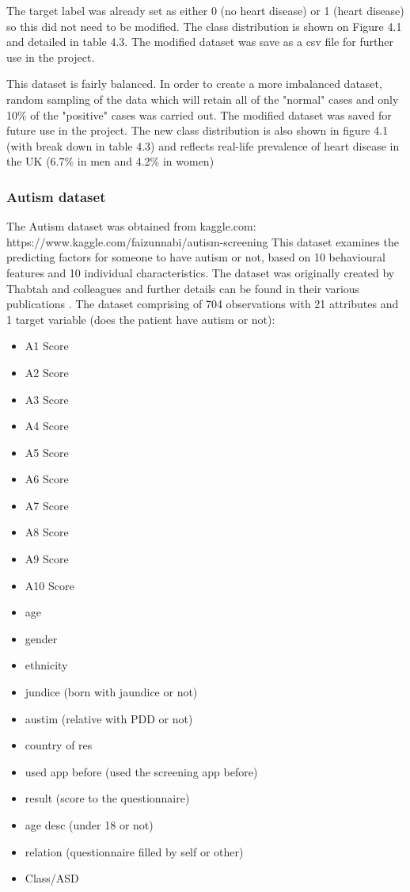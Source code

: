 The target label was already set as either 0 (no heart disease) or 1 (heart disease) so this did not need to be modified. 
The class distribution is shown on Figure 4.1 and detailed in table 4.3. The modified dataset was save as a csv file for further use in the project.

This dataset is fairly balanced. In order to create a more imbalanced dataset, random sampling of the data which will retain all of the "normal" cases and only 10\% of the "positive" cases was carried out. The modified dataset was saved for future use in the project. The new class distribution is also shown in figure 4.1 (with break down in table 4.3) and reflects real-life prevalence of heart disease in the UK (6.7\% in men and 4.2\% in women) \citep{}\newline

\subsubsection{Autism dataset}
The Autism dataset was obtained from kaggle.com:\newline
https://www.kaggle.com/faizunnabi/autism-screening\newline
This dataset examines the predicting factors for someone to have autism or not, based on 10 behavioural features and 10 individual characteristics. The dataset was originally created by Thabtah and colleagues \citep{} and further details can be found in their various publications \cite{}.\newline
The dataset comprising of 704 observations with 21 attributes and 1 target variable (does the patient have autism or not):\newline
\begin{itemize}
    \item A1 Score 
    \item A2 Score
    \item A3 Score 
    \item A4 Score
    \item A5 Score
    \item A6 Score
    \item A7 Score
    \item A8 Score
    \item A9 Score
    \item A10 Score
    \item age
    \item gender
    \item ethnicity 
    \item jundice (born with jaundice or not)
    \item austim (relative with PDD or not)
    \item country of res
    \item used app before (used the screening app before)
    \item result (score to the questionnaire)
    \item age desc (under 18 or not)
    \item relation (questionnaire filled by self or other)
    \item Class/ASD
\end{itemize}

